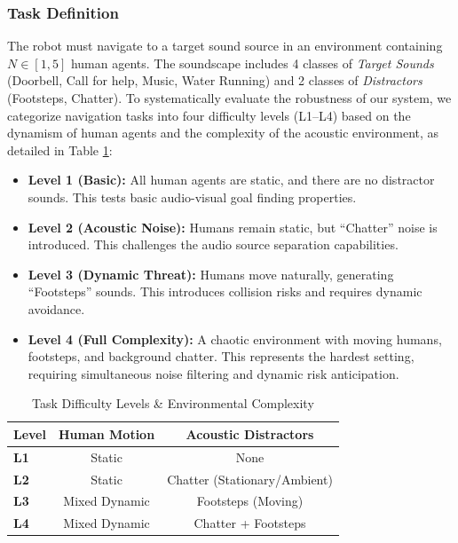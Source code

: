 \subsubsection{Task Definition}
The robot must navigate to a target sound source in an environment containing $N \in [1, 5]$ human agents. The soundscape includes 4 classes of \textit{Target Sounds} (Doorbell, Call for help, Music, Water Running) and 2 classes of \textit{Distractors} (Footsteps, Chatter). 
To systematically evaluate the robustness of our system, we categorize navigation tasks into four difficulty levels (L1--L4) based on the dynamism of human agents and the complexity of the acoustic environment, as detailed in Table \ref{tab:difficulty_levels}:

\begin{itemize}
    \item \textbf{Level 1 (Basic):} All human agents are static, and there are no distractor sounds. This tests basic audio-visual goal finding properties.
    \item \textbf{Level 2 (Acoustic Noise):} Humans remain static, but ``Chatter'' noise is introduced. This challenges the audio source separation capabilities.
    \item \textbf{Level 3 (Dynamic Threat):} Humans move naturally, generating ``Footsteps'' sounds. This introduces collision risks and requires dynamic avoidance.
    \item \textbf{Level 4 (Full Complexity):} A chaotic environment with moving humans, footsteps, and background chatter. This represents the hardest setting, requiring simultaneous noise filtering and dynamic risk anticipation.
\end{itemize}

\begin{table}[t]
\caption{Task Difficulty Levels \& Environmental Complexity}
\label{tab:difficulty_levels}
\centering
\begin{tabular}{l c c}
\hline
\textbf{Level} & \textbf{Human Motion} & \textbf{Acoustic Distractors} \\
\hline
\textbf{L1} & Static & None \\
\textbf{L2} & Static & Chatter (Stationary/Ambient) \\
\textbf{L3} & Mixed Dynamic & Footsteps (Moving) \\
\textbf{L4} & Mixed Dynamic & Chatter + Footsteps \\
\hline
\end{tabular}
\end{table}

